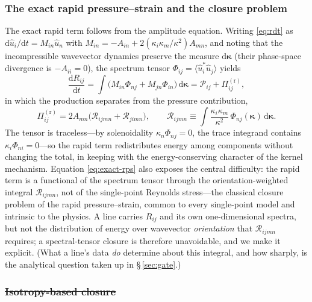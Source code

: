 \documentclass[lineno]{JFM-FLM_Au}
\providecommand{\DIFadd}[1]{{\protect\color{blue}\uwave{#1}}} %
\providecommand{\DIFdel}[1]{{\protect\color{red}\sout{#1}}} %
\providecommand{\DIFaddbegin}{} %
\providecommand{\DIFaddend}{} %
\providecommand{\DIFdelbegin}{} %
\providecommand{\DIFdelend}{} %
\begin{document}
\subsubsection{The exact rapid pressure--strain and the closure problem}
\label{sec:closure-problem}

The exact rapid term follows from the amplitude equation. Writing
\eqref{eq:rdt} as $\mathrm{d}\hat u_i/\mathrm{d}t=M_{in}\hat u_n$ with
$M_{in}=-A_{in}+2(\kappa_i\kappa_m/\kappa^2)A_{mn}$, and noting that the
incompressible wavevector dynamics preserve the measure
$\mathrm{d}\boldsymbol{\kappa}$ (their phase-space divergence is
$-A_{ii}=0$), the spectrum tensor
$\Phi_{ij}=\langle\hat u_i^{*}\hat u_j\rangle$ yields
\begin{equation}
  \frac{\mathrm{d}R_{ij}}{\mathrm{d}t}
  = \int\!\big(M_{in}\Phi_{nj}+M_{jn}\Phi_{in}\big)\,
    \mathrm{d}\boldsymbol{\kappa}
  = \mathcal{P}_{ij} + \Pi^{(\mathrm r)}_{ij},
  \label{eq:dRdt-rdt}
\end{equation}
in which the production separates from the pressure contribution,
\begin{equation}
  \Pi^{(\mathrm r)}_{ij}
  = 2A_{mn}\big(\mathcal{R}_{ijmn}+\mathcal{R}_{jimn}\big),
  \qquad
  \mathcal{R}_{ijmn} \equiv
  \int \frac{\kappa_i \kappa_m}{\kappa^2}\,
  \Phi_{nj}(\boldsymbol{\kappa})\,\mathrm{d}\boldsymbol{\kappa}.
  \label{eq:exact-rps}
\end{equation}
The tensor is traceless---by solenoidality $\kappa_n\Phi_{nj}=0$, the
trace integrand contains $\kappa_i\Phi_{ni}=0$---so the rapid term
redistributes energy among components without changing the total, in
keeping with the energy-conserving character of the kernel mechanism.
Equation \eqref{eq:exact-rps} also exposes the central difficulty: the
rapid term is a functional of the spectrum tensor through the
orientation-weighted integral $\mathcal{R}_{ijmn}$, not of the
single-point Reynolds stress---the classical closure problem of the rapid
pressure--strain, common to every single-point model
\citep{Crow1968,LaunderReeceRodi1975,Pope2000} and intrinsic to the
physics. A line carries $R_{ij}$ and its own one-dimensional spectra, but
not the distribution of energy over wavevector \emph{orientation} that
$\mathcal{R}_{ijmn}$ requires; a spectral-tensor closure is therefore
unavoidable, and we make it explicit. (What a line's data \emph{do}
determine about this integral, and how sharply, is the analytical
question taken up in \S\,\ref{sec:gate}.)

\subsubsection{\DIFdelbegin \DIFdel{Isotropy-based closure}\DIFdelend \DIFaddbegin \DIFadd{Closure of the pressure contribution}\DIFaddend }\label{sec:iso-closure}
\end{document}
